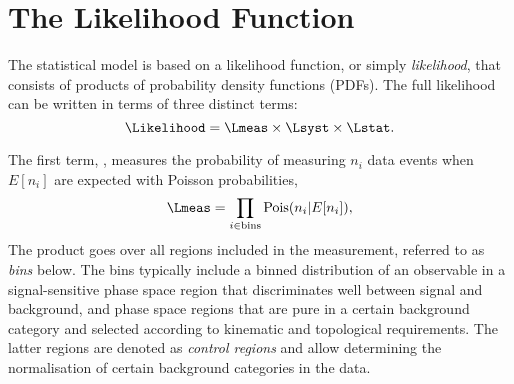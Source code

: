 
\section{The Likelihood Function}
\label{sec:likelihood}
The statistical model is based on a likelihood function, or simply \emph{likelihood}, that consists of products of probability density functions (PDFs). The full likelihood can be written in terms of three distinct terms:
\begin{equation}
    \Likelihood = \Lmeas \times \Lsyst \times \Lstat.
\end{equation}

The first term, \Lmeas, measures the probability of measuring $n_i$ data events when $E[n_i]$ are expected with Poisson probabilities, 
\begin{equation}
    \Lmeas = \prod_{i \in \text{bins}} \text{Pois}(n_i | E[n_i] ),
\end{equation}
The product goes over all regions included in the measurement, referred to as \emph{bins} below. The bins typically include a binned distribution of an observable in a signal-sensitive phase space region that discriminates well between signal and background, and phase space regions that are pure in a certain background category and selected according to kinematic and topological requirements. The latter regions are denoted as \emph{control regions} and allow determining the normalisation of certain background categories in the data.

